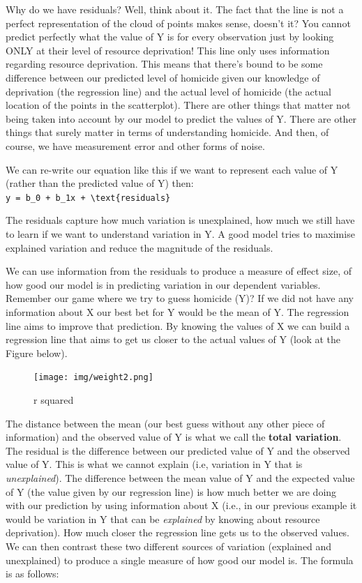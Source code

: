 \documentclass[]{book}
\begin{document}
Why do we have residuals? Well, think about it. The fact that the line is not a perfect representation of the cloud of points makes sense, doesn't it? You cannot predict perfectly what the value of Y is for every observation just by looking ONLY at their level of resource deprivation! This line only uses information regarding resource deprivation. This means that there's bound to be some difference between our predicted level of homicide given our knowledge of deprivation (the regression line) and the actual level of homicide (the actual location of the points in the scatterplot). There are other things that matter not being taken into account by our model to predict the values of Y. There are other things that surely matter in terms of understanding homicide. And then, of course, we have measurement error and other forms of noise.

We can re-write our equation like this if we want to represent each value of Y (rather than the predicted value of Y) then:
\texttt{y\ =\ b\_0\ +\ b\_1x\ +\ \textbackslash{}text\{residuals\}}

The residuals capture how much variation is unexplained, how much we still have to learn if we want to understand variation in Y. A good model tries to maximise explained variation and reduce the magnitude of the residuals.

We can use information from the residuals to produce a measure of effect size, of how good our model is in predicting variation in our dependent variables. Remember our game where we try to guess homicide (Y)? If we did not have any information about X our best bet for Y would be the mean of Y. The regression line aims to improve that prediction. By knowing the values of X we can build a regression line that aims to get us closer to the actual values of Y (look at the Figure below).

\begin{figure}
\centering
\texttt{[image: img/weight2.png]}
\caption{r squared}
\end{figure}

The distance between the mean (our best guess without any other piece of information) and the observed value of Y is what we call the \textbf{total variation}. The residual is the difference between our predicted value of Y and the observed value of Y. This is what we cannot explain (i.e, variation in Y that is \emph{unexplained}). The difference between the mean value of Y and the expected value of Y (the value given by our regression line) is how much better we are doing with our prediction by using information about X (i.e., in our previous example it would be variation in Y that can be \emph{explained} by knowing about resource deprivation). How much closer the regression line gets us to the observed values. We can then contrast these two different sources of variation (explained and unexplained) to produce a single measure of how good our model is. The formula is as follows:
\end{document}
